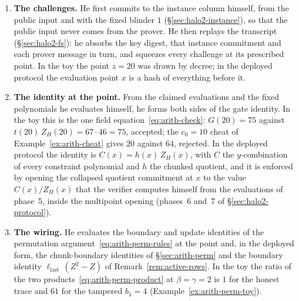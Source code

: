 \documentclass[11pt,a4paper]{article}
\theoremstyle{definition}
\newcommand{\ZH}{Z_H}
\begin{document}
\begin{enumerate}[leftmargin=*, itemsep=2pt]
\item \textbf{The challenges.} He first commits to the instance column
  himself, from the public input and with the fixed blinder $1$
  (\S\ref{sec:halo2-instance}), so that the public input never comes
  from the prover. He then replays the transcript
  (\S\ref{sec:halo2-fs}): he absorbs the key digest, that instance
  commitment and each prover message in turn, and squeezes every
  challenge at its prescribed point. In the toy the point $z = 20$ was
  drawn by decree; in the deployed protocol the evaluation point $x$
  is a hash of everything before it.
\item \textbf{The identity at the point.} From the claimed evaluations
  and the fixed polynomials he evaluates himself, he forms both sides
  of the gate identity. In the toy this is the one field
  equation~\eqref{eq:arith-check}: $G(20) = 75$ against
  $t(20)\,\ZH(20) = 67 \cdot 46 = 75$, accepted; the $c_0 = 10$ cheat
  of Example~\ref{ex:arith-cheat} gives $20$ against $64$, rejected.
  In the deployed protocol the identity is $C(x) = h(x)\,\ZH(x)$, with
  $C$ the $y$-combination of every constraint polynomial and $h$ the
  chunked quotient, and it is enforced by opening the collapsed
  quotient commitment at $x$ to the value $C(x)/\ZH(x)$ that the
  verifier computes himself from the evaluations of phase~5, inside the
  multipoint opening (phases~6 and~7 of \S\ref{sec:halo2-protocol}).
\item \textbf{The wiring.} He evaluates the boundary and update identities
  of the permutation argument~\eqref{eq:arith-perm-rules} at the point
  and, in the deployed form, the chunk-boundary identities of
  \S\ref{sec:arith-perm} and the boundary identity
  $\ell_{\mathrm{last}}\,(Z^2 - Z)$ of Remark~\ref{rem:active-rows}.
  In the toy the ratio of the two products~\eqref{eq:arith-perm-product}
  at $\beta = \gamma = 2$ is $1$ for the honest trace and $61$ for the
  tampered $b_1 = 4$ (Example~\ref{ex:arith-perm-toy}).

\end{enumerate}
\end{document}
